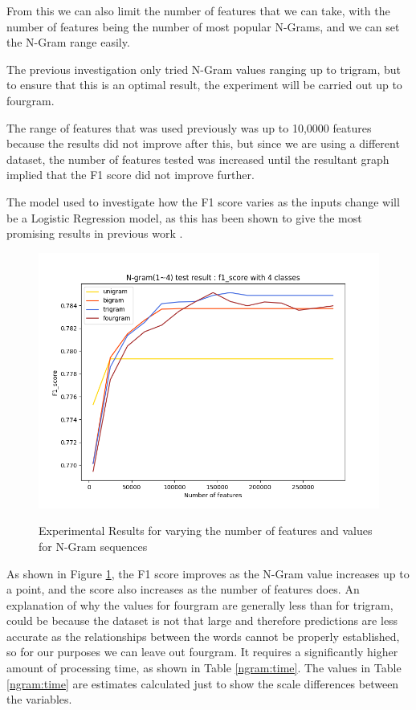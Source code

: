 From this we can also limit the number of features that we can take, with the number of features being the number of most popular N-Grams, and we can set the N-Gram range easily. 

The previous investigation only tried N-Gram values ranging up to trigram, but to ensure that this is an optimal result, the experiment will be carried out up to fourgram.

The range of features that was used previously was up to 10,0000 features because the results did not improve after this, but since we are using a different dataset, the number of features tested was increased until the resultant graph implied that the F1 score did not improve further. 

The model used to investigate how the F1 score varies as the inputs change will be a Logistic Regression model, as this has been shown to give the most promising results in previous work \cite{towardsDS}.

\begin{figure}[h]
\caption{Experimental Results for varying the number of features and values for N-Gram sequences}
\centering
\includegraphics[scale=0.7]{graphs/nGramBinaryGraph300000.png}
\label{ngramGraph}
\end{figure}

As shown in Figure \ref{ngramGraph}, the F1 score improves as the N-Gram value increases up to a point, and the score also increases as the number of features does. An explanation of why the values for fourgram are generally less than for trigram, could be because the dataset is not that large and therefore predictions are less accurate as the relationships between the words cannot be properly established, so for our purposes we can leave out fourgram. It requires a significantly higher amount of processing time, as shown in Table \ref{ngram:time}. The values in Table \ref{ngram:time} are estimates calculated just to show the scale differences between the variables.


